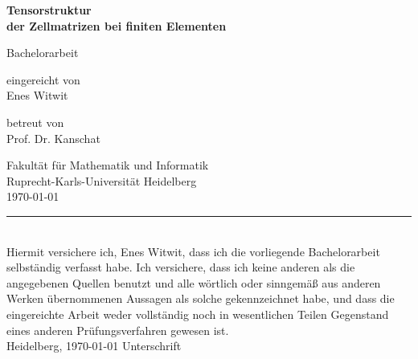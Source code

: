 \documentclass[12pt,a4paper]{scrartcl}
\numberwithin{equation}{section}
\begin{document}
\pagestyle{empty}
\setcounter{tocdepth}{3}




\begin{titlepage}

\vspace*{0.5cm} 
\begin{center} 


{\huge{ 
\begin{singlespace}
\textbf{Tensorstruktur \\ der Zellmatrizen bei finiten Elementen}
\end{singlespace}
}}
\vspace*{4cm}

{\Large Bachelorarbeit}
\vspace*{1cm}


eingereicht von \\[0.5cm]

{\Large Enes Witwit}
\vspace*{1cm}

betreut von  \\[0.5cm]
{\Large Prof. Dr. Kanschat}
\vspace*{4.5cm}


Fakultät für Mathematik und Informatik\\[0.3cm]
Ruprecht-Karls-Universität Heidelberg \\[0.3cm]
\today
\end{center}
\end{titlepage}


\newpage\phantom{Leer}
\thispagestyle{empty}
\newpage
\thispagestyle{empty}
\vspace*{15cm}

\noindent\rule{16cm}{0.4pt} \\
Hiermit versichere ich, Enes Witwit, dass ich die vorliegende Bachelorarbeit selbständig
verfasst habe.
Ich versichere, dass ich keine anderen als die angegebenen Quellen benutzt und
alle wörtlich oder sinngemäß aus anderen Werken übernommenen Aussagen als
solche gekennzeichnet habe, und dass die eingereichte Arbeit weder vollständig
noch in wesentlichen Teilen Gegenstand eines anderen Prüfungsverfahren
gewesen ist. \\[5ex] 
Heidelberg, \today \hspace*{8cm} Unterschrift\\[5ex]
\end{document}
